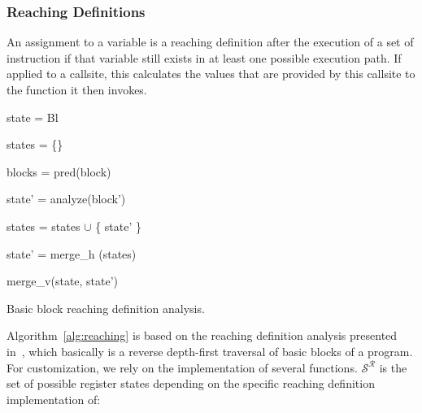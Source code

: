 \subsubsection{Reaching Definitions}
\label{subsection:reachindefinitionstheory}
An assignment to a variable is a reaching definition after the execution of a set of instruction if that variable still exists in at least one possible execution path. 
If applied to a callsite, this calculates the values that are provided by this callsite to the function it then invokes. 

\begin{algorithm}[!ht]
	\SetAlgoLined
        \BlankLine
	{
 	state = Bl                                   
 	

	states = \{\}                                
	
	blocks = pred(block)                         
	
	 {
	
 		state' = analyze(block')             
 		
		states = states $\cup$ \{ state' \}  
	}

	state' = merge\_h (states)                   

	\Return merge\_v(state, state')              

	}
\caption{Basic block reaching definition analysis.}
\label{alg:reaching}
\end{algorithm}

Algorithm~\ref{alg:reaching} is based on the reaching definition analysis presented in~\cite{khedker2009data}, 
which basically is a reverse depth-first traversal of basic blocks of a program. For customization, we rely on 
the implementation of several functions. $\mathcal{S}^\mathcal{R}$ is the set of possible register states depending on the specific reaching definition implementation of:

